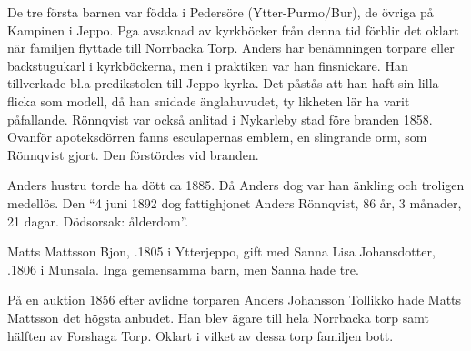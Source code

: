 \begin{jhchildren}
  \item {}
  \item {}
  \item {}
  \item {}
  \item {}
  \item {}
  \item {}
  \item {}
\end{jhchildren}

De tre första barnen var födda i Pedersöre (Ytter-Purmo/Bur), de övriga på Kampinen i Jeppo. Pga avsaknad av kyrkböcker från denna tid förblir det oklart när familjen flyttade till Norrbacka Torp. Anders har benämningen torpare eller backstugukarl i kyrkböckerna, men i praktiken var han finsnickare. Han tillverkade bl.a predikstolen till Jeppo kyrka. Det påstås att han haft sin lilla flicka som modell, då han snidade änglahuvudet, ty likheten lär ha varit påfallande. Rönnqvist var också anlitad i Nykarleby stad före branden 1858. Ovanför apoteksdörren fanns esculapernas emblem, en slingrande orm, som Rönnqvist gjort. Den förstördes vid branden.

Anders hustru torde ha dött ca 1885. Då Anders dog var han änkling och troligen medellös. Den ``4 juni 1892 dog fattighjonet Anders Rönnqvist, 86 år, 3 månader, 21 dagar. Dödsorsak: ålderdom''.


Matts Mattsson Bjon, .1805 i Ytterjeppo, gift med Sanna Lisa Johansdotter, .1806 i Munsala. Inga gemensamma barn, men Sanna hade tre.

\begin{jhchildren}
  \item {}
  \item {}
  \item {}
\end{jhchildren}

På en auktion 1856 efter avlidne torparen Anders Johansson Tollikko hade Matts Mattsson det högsta anbudet. Han blev ägare till hela	Norrbacka torp samt hälften av Forshaga Torp. Oklart i vilket av dessa torp  familjen bott.


